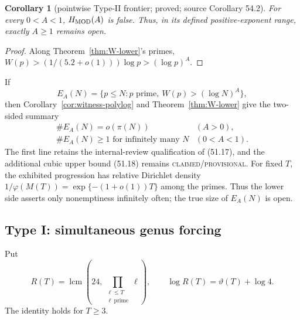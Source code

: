 \documentclass[10pt,reqno]{amsart}
\newtheorem{corollary}[theorem]{Corollary}
\theoremstyle{definition}
\newcommand{\lcm}{\operatorname {lcm}}
\newcommand{\1}{\mathbf 1}
\begin{document}
\begin{corollary}[pointwise Type-II frontier; proved; source Corollary 54.2]
\label{cor:MOD-frontier}
For every $0<A<1$, $H_{\rm MOD}(A)$ is false.  Thus, in its defined
positive-exponent range, exactly $A\geq1$ remains open.
\end{corollary}
\begin{proof}
Along Theorem~\ref{thm:W-lower}'s primes,
$W(p)>(1/(5.2+o(1)))\log p>(\log p)^A$.
\end{proof}
If
\[
 E_A(N)=\{p\leq N:p\text{ prime},\ W(p)>(\log N)^A\},
\]
then Corollary~\ref{cor:witness-polylog} and
Theorem~\ref{thm:W-lower} give the two-sided summary
\begin{equation}\tag{54.5}
 \begin{array}{ll}
  \#E_A(N)=o(\pi(N))& (A>0),\\
  \#E_A(N)\geq1\text{ for infinitely many }N&(0<A<1).
 \end{array}
\end{equation}
The first line retains the internal-review qualification of (51.17), and
the additional cubic upper bound (51.18) remains
\textsc{claimed/provisional}.  For fixed $T$, the exhibited progression has
relative Dirichlet density
$1/\varphi(M(T))=\exp\{-(1+o(1))T\}$ among the primes.  Thus the lower side
asserts only nonemptiness infinitely often; the true size of $E_A(N)$ is
open.

\subsection{Type I: simultaneous genus forcing}
Put
\begin{equation}\tag{54.6}
 R(T)=\lcm\left(24,
       \prod_{\substack{\ell\leq T\\\ell\ \mathrm{prime}}}\ell\right),
 \qquad \log R(T)=\vartheta(T)+\log4.
\end{equation}
The identity holds for $T\geq3$.
\end{document}
